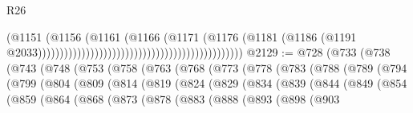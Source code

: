 \begin{lexlean}{R26}
\begin{coremodule}
                                                                                (@1151
                                                                                  (@1156
                                                                                    (@1161
                                                                                      (@1166
                                                                                        (@1171
                                                                                          (@1176
                                                                                            (@1181
                                                                                              (@1186
                                                                                                (@1191
                                                                                                  @2033)))))))))))))))))))))))))))))))))))))))))))))))
@2129 := @728
    (@733
      (@738
        (@743
          (@748
            (@753
              (@758
                (@763
                  (@768
                    (@773
                      (@778
                        (@783
                          (@788
                            (@789
                              (@794
                                (@799
                                  (@804
                                    (@809
                                      (@814
                                        (@819
                                          (@824
                                            (@829
                                              (@834
                                                (@839
                                                  (@844
                                                    (@849
                                                      (@854
                                                        (@859
                                                          (@864
                                                            (@868
                                                              (@873
                                                                (@878
                                                                  (@883
                                                                    (@888
                                                                      (@893
                                                                        (@898
                                                                          (@903

\end{coremodule}
\end{lexlean}

